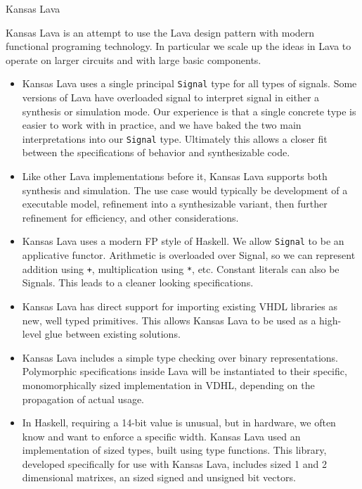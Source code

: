 \documentclass{scrreprt}
\begin{document}
\begin{hcarentry}{Kansas Lava}
\makeheader

Kansas Lava is an attempt to use the Lava design pattern with modern functional programing
technology. In particular we scale up the ideas in Lava to operate
on larger circuits and with large basic components. 
\begin{itemize}
\item Kansas Lava uses a single principal \verb|Signal| type for all types of signals. 
Some versions
of Lava have overloaded signal to interpret signal in either a synthesis or
simulation mode. Our experience is that a single concrete type is easier
to work with in practice, and we have baked the two main interpretations
into our \verb|Signal| type. Ultimately this allows a closer fit between
the specifications of behavior and synthesizable code. 
\item Like other Lava implementations before it, Kansas Lava supports both synthesis and simulation.
The use case would typically be development of a executable model, refinement into
a synthesizable variant, then further refinement for efficiency, and other considerations.
\item Kansas Lava uses a modern FP style of Haskell. We allow \verb|Signal| to
be an applicative functor. Arithmetic is overloaded over Signal,
so we can represent addition using \verb|+|, multiplication using \verb|*|, etc.
Constant literals can also be Signals. 
This leads to a cleaner looking specifications.
\item Kansas Lava has direct support for importing existing
VHDL libraries as new, well typed primitives. This allows Kansas Lava to 
be used as a high-level glue between existing solutions.
\item Kansas Lava includes a simple type checking over binary representations.
Polymorphic specifications inside Lava will be instantiated
to their specific, monomorphically sized implementation in VDHL,
depending on the propagation of actual usage.
\item In Haskell, requiring a 14-bit value is unusual, but in hardware, we often
know and want to enforce a specific width. 
Kansas Lava used an implementation of sized types, built using type functions.
This library, developed specifically for use with Kansas Lava, includes
sized 1 and 2 dimensional matrixes, an sized signed and unsigned bit vectors.
\end{itemize}


\end{hcarentry}
\end{document}
